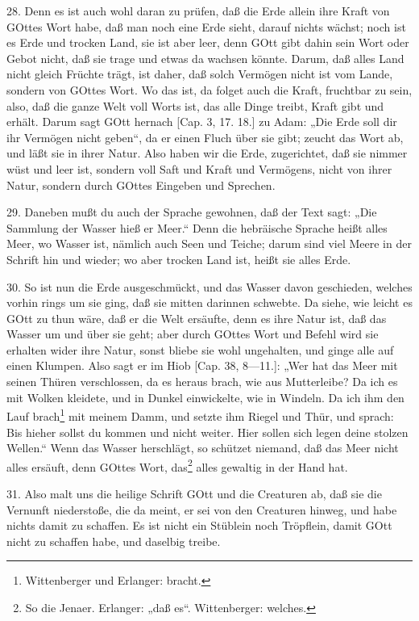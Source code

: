28. Denn es ist auch wohl daran zu prüfen, daß die Erde allein ihre Kraft von GOttes Wort habe, daß man noch eine Erde sieht, darauf nichts wächst; noch ist es Erde und trocken Land, sie ist aber leer, denn GOtt gibt dahin sein Wort oder Gebot nicht, daß sie trage und etwas da wachsen könnte. Darum, daß alles Land nicht gleich Früchte trägt, ist daher, daß solch Vermögen nicht ist vom Lande, sondern von GOttes Wort. Wo das ist, da folget auch die Kraft, fruchtbar zu sein, also, daß die ganze Welt voll Worts ist, das alle Dinge treibt, Kraft gibt und erhält. Darum sagt GOtt hernach [Cap. 3, 17. 18.] zu Adam: „Die Erde soll dir ihr Vermögen nicht geben“, da er einen Fluch über sie gibt; zeucht das Wort ab, und läßt sie in ihrer Natur. Also haben wir die Erde, zugerichtet, daß sie nimmer wüst und leer ist, sondern voll Saft und Kraft und Vermögens, nicht von ihrer Natur, sondern durch GOttes Eingeben und Sprechen.

29. Daneben mußt du auch der Sprache gewohnen, daß der Text sagt: „Die Sammlung der Wasser hieß er Meer.“ Denn die hebräische Sprache heißt alles Meer, wo Wasser ist, nämlich auch Seen und Teiche; darum sind viel Meere in der Schrift hin und wieder; wo aber trocken Land ist, heißt sie alles Erde.

30. So ist nun die Erde ausgeschmückt, und das Wasser davon geschieden, welches vorhin rings um sie ging, daß sie mitten darinnen schwebte. Da siehe, wie leicht es GOtt zu thun wäre, daß er die Welt ersäufte, denn es ihre Natur ist, daß das Wasser um und über sie geht; aber durch GOttes Wort und Befehl wird sie erhalten wider ihre Natur, sonst bliebe sie wohl ungehalten, und ginge alle auf einen Klumpen. Also sagt er im Hiob [Cap. 38, 8—11.]: „Wer hat das Meer mit seinen Thüren verschlossen, da es heraus brach, wie aus Mutterleibe? Da ich es mit Wolken kleidete, und in Dunkel einwickelte, wie in Windeln. Da ich ihm den Lauf brach\footnote{Wittenberger und Erlanger: bracht.} mit meinem Damm, und setzte ihm Riegel und Thür, und sprach: Bis hieher sollst du kommen und nicht weiter. Hier sollen sich legen deine stolzen Wellen.“ Wenn das Wasser herschlägt, so schützet niemand, daß das Meer nicht alles ersäuft, denn GOttes Wort, das\footnote{So die Jenaer. Erlanger: „daß es“. Wittenberger: welches.} alles gewaltig in der Hand hat.

31. Also malt uns die heilige Schrift GOtt und die Creaturen ab, daß sie die Vernunft niederstoße, die da meint, er sei von den Creaturen hinweg, und habe nichts damit zu schaffen. Es ist nicht ein Stüblein noch Tröpflein, damit GOtt nicht zu schaffen habe, und daselbig treibe.

